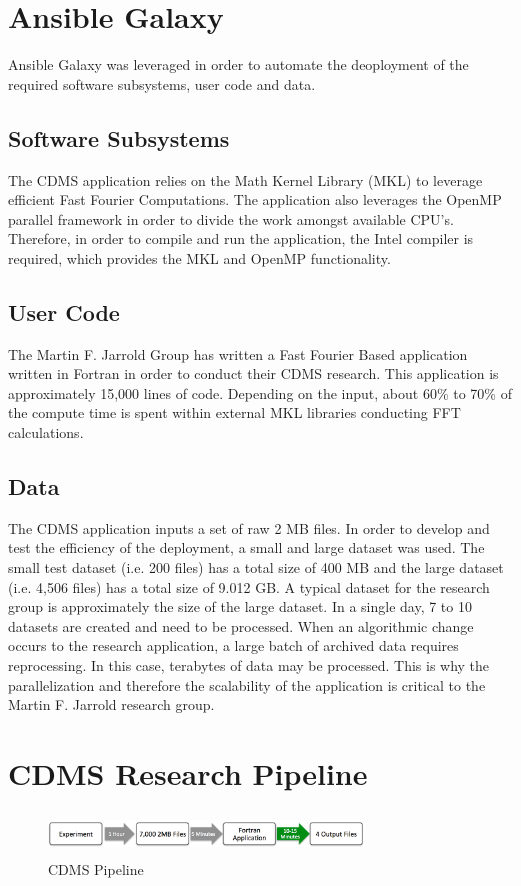 \documentclass[9pt,twocolumn,twoside]{../../styles/osajnl}
\begin{document}
\section{Ansible Galaxy} \label{licensing}
Ansible Galaxy was leveraged in order to automate the deoployment of
the required software subsystems, user code and data.

\subsection{Software Subsystems} \label{software}
The CDMS application relies on the Math Kernel Library (MKL) to
leverage efficient Fast Fourier Computations. The application also
leverages the OpenMP parallel framework in order to divide the work
amongst available CPU's. Therefore, in order to compile and run the
application, the Intel compiler is required, which provides the MKL
and OpenMP functionality.

\subsection{User Code} \label{code}
The Martin F. Jarrold Group has written a Fast Fourier Based
application written in Fortran in order to conduct their CDMS
research. This application is approximately 15,000 lines of
code. Depending on the input, about 60\% to 70\% of the compute time
is spent within external MKL libraries conducting FFT calculations.

\subsection{Data} \label{data}
The CDMS application inputs a set of raw 2 MB files. In order to
develop and test the efficiency of the deployment, a small and large
dataset was used. The small test dataset (i.e. 200 files) has a total
size of 400 MB and the large dataset (i.e. 4,506 files) has a total
size of 9.012 GB. A typical dataset for the research group is
approximately the size of the large dataset. In a single day, 7 to 10
datasets are created and need to be processed. When an algorithmic
change occurs to the research application, a large batch of archived
data requires reprocessing. In this case, terabytes of data may be
processed. This is why the parallelization and therefore the
scalability of the application is critical to the Martin F. Jarrold
research group. 

\section{CDMS Research Pipeline} \label{cdms}
\begin{figure}
\centering
\includegraphics[height=0.45in, width=3.3in]{images/pipeline}
\caption{CDMS Pipeline}
\end{figure}
\end{document}
